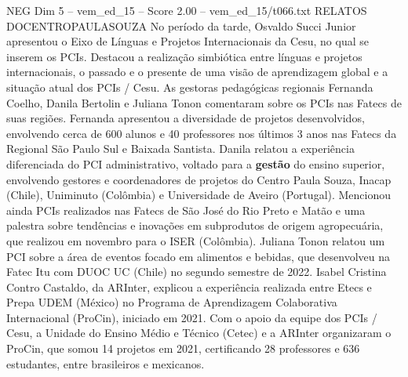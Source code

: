 \begin{textsample}{NEG Dim 5 – vem\_ed\_15 – Score 2.00 – vem\_ed\_15/t066.txt}  \label{ex:f5_neg_049}
RELATOS DOCENTROPAULASOUZA No período da tarde, Osvaldo Succi Junior apresentou o Eixo de Línguas e Projetos Internacionais da Cesu, no qual se inserem os PCIs.
Destacou a realização simbiótica entre línguas e projetos internacionais, o passado e o presente de uma visão de aprendizagem global e a situação atual dos PCIs / Cesu.
As gestoras pedagógicas regionais Fernanda Coelho, Danila Bertolin e Juliana Tonon comentaram sobre os PCIs nas Fatecs de suas regiões.
Fernanda apresentou a diversidade de projetos desenvolvidos, envolvendo cerca de 600 alunos e 40 professores nos últimos 3 anos nas Fatecs da Regional São Paulo Sul e Baixada Santista.
Danila relatou a experiência diferenciada do PCI administrativo, voltado para a \textbf{gestão} do ensino superior, envolvendo gestores e coordenadores de projetos do Centro Paula Souza, Inacap (Chile), Uniminuto (Colômbia) e Universidade de Aveiro (Portugal).
Mencionou ainda PCIs realizados nas Fatecs de São José do Rio Preto e Matão e uma palestra sobre tendências e inovações em subprodutos de origem agropecuária, que realizou em novembro para o ISER (Colômbia).
Juliana Tonon relatou um PCI sobre a área de eventos focado em alimentos e bebidas, que desenvolveu na Fatec Itu com DUOC UC (Chile) no segundo semestre de 2022.
Isabel Cristina Contro Castaldo, da ARInter, explicou a experiência realizada entre Etecs e Prepa UDEM (México) no Programa de Aprendizagem Colaborativa Internacional (ProCin), iniciado em 2021.
Com o apoio da equipe dos PCIs / Cesu, a Unidade do Ensino Médio e Técnico (Cetec) e a ARInter organizaram o ProCin, que somou 14 projetos em 2021, certificando 28 professores e 636 estudantes, entre brasileiros e mexicanos.

\end{textsample}
